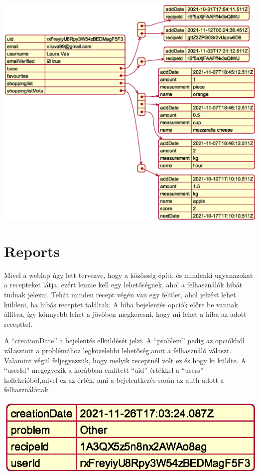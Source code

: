 \documentclass[12pt]{report}
\theoremstyle{definition}
\begin{document}
\noindent
\includegraphics[width=\textwidth]{out/diagrams/jsonUsers/jsonUsers.eps}

\section{Reports}
Mivel a weblap úgy lett tervezve, hogy a közösség építi, és mindenki ugyanazokat a recepteket látja, ezért lennie kell egy lehetőségnek, ahol a felhasználók hibát tudnak jelezni. Tehát minden recept végén van egy felület, ahol jelzést lehet küldeni, ha hibás receptet találtak. A hiba bejelentés opciók előre be vannak állítva, így könnyebb lehet a jövőben megkeresni, hogy mi lehet a hiba az adott recepttel. 

A “creationDate” a bejelentés elküldését jelzi. A “problem” pedig az opciókból választott a problémához legközelebbi lehetőség,amit a felhasználó választ. Valamint végül feljegyezzük, hogy melyik receptnél volt ez és hogy ki küldte. A “userId” megegyezik a korábban említett “uid” értékkel a “users” kollekcióból,mivel ez az érték, ami a bejelentkezés során az auth adott a felhasználónak.

\noindent
\includegraphics[scale=0.6]{out/diagrams/jsonReports/jsonReports.eps}
\end{document}
